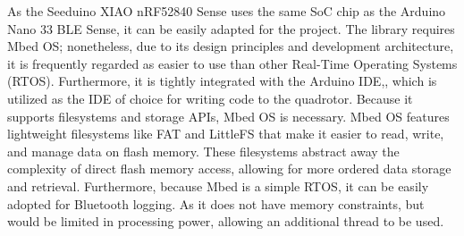 As the Seeduino XIAO nRF52840 Sense uses the same SoC chip as the Arduino Nano 33 BLE Sense, it can be easily adapted for the project. \cite{Nano33} \cite{wikiSeeed}
The library requires Mbed OS; nonetheless, due to its design principles and development architecture, it is frequently regarded as easier to use than other Real-Time Operating Systems (RTOS). Furthermore, it is tightly integrated with the Arduino IDE,\cite{MbedNano}, which is utilized as the IDE of choice for writing code to the quadrotor. Because it supports filesystems and storage APIs, Mbed OS is necessary. Mbed OS features lightweight filesystems like FAT and LittleFS that make it easier to read, write, and manage data on flash memory. \cite{MbedWiki}
These filesystems abstract away the complexity of direct flash memory access, allowing for more ordered data storage and retrieval. Furthermore, because Mbed is a simple RTOS, it can be easily adopted for Bluetooth logging. As it does not have memory constraints, but would be limited in processing power, allowing an additional thread to be used.